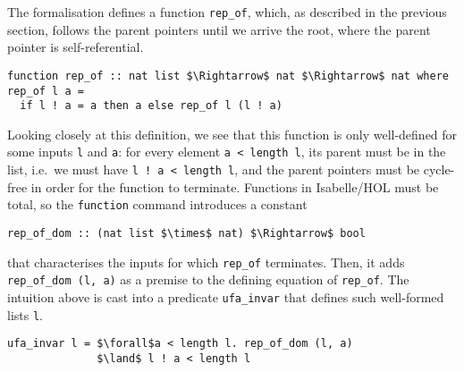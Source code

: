 \documentclass[
  sigplan,
  10pt,
  anonymous,
  review,
  ]{acmart}
\begin{document}
The formalisation defines a function \lstinline|rep_of|, which, as described in the previous section, follows the parent pointers until we arrive the root, where the parent pointer is self-referential.
\begin{lstlisting}[columns=fullflexible]
function rep_of :: nat list $\Rightarrow$ nat $\Rightarrow$ nat where
rep_of l a =
  if l ! a = a then a else rep_of l (l ! a)
\end{lstlisting}
Looking closely at this definition, we see that this function is only well-defined for some inputs \lstinline|l| and \lstinline|a|:
for every element \lstinline|a < length l|, its parent must be in the list, i.e.\ we must have \lstinline|l ! a < length l|, and the parent pointers must be cycle-free in order for the function to terminate.
Functions in Isabelle/HOL must be total, so the \lstinline|function| command introduces a constant
\begin{lstlisting}
rep_of_dom :: (nat list $\times$ nat) $\Rightarrow$ bool  
\end{lstlisting}
that characterises the inputs for which \lstinline|rep_of| terminates.
Then, it adds \lstinline|rep_of_dom (l, a)| as a premise to the defining equation of \lstinline|rep_of|. 
The intuition above is cast into a predicate \lstinline|ufa_invar| that defines such well-formed lists \lstinline|l|.
\begin{lstlisting}
ufa_invar l = $\forall$a < length l. rep_of_dom (l, a)
              $\land$ l ! a < length l
\end{lstlisting}
\end{document}
